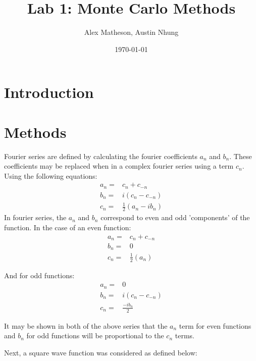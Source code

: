 \documentclass[twocolumn]{article}
\begin{document}
\title{Lab 1: Monte Carlo Methods}
\author{Alex Matheson, Austin Nhung}
\date{\today}
\maketitle

\section{Introduction}

\section{Methods}
Fourier series are defined by calculating the fourier coefficients $a_n$ and $b_n$. These coefficients may be replaced when in a complex fourier series using a term $c_n$. Using the following equations:
\begin{equation}
\begin{split}
a_n =& c_n + c_{-n} \\
b_n =& i(c_n - c_{-n}) \\
c_n =& \frac{1}{2}(a_n - ib_n)
\end{split}
\end{equation}
In fourier series, the $a_n$ and $b_n$ correspond to even and odd 'components' of the function. In the case of an even function:
\begin{equation}
\begin{split}
a_n =& c_n + c_{-n} \\
b_n =& 0 \\
c_n =& \frac{1}{2}(a_n)
\end{split}
\end{equation}

And for odd functions:
\begin{equation}
\begin{split}
a_n =& 0 \\
b_n =& i(c_n - c_{-n}) \\
c_n =& \frac{-ib_n}{2}
\end{split}
\end{equation} 
 
It may be shown in both of the above series that the $a_n$ term for even functions and $b_n$ for odd functions will be proportional to the $c_n$ terms. 

Next, a square wave function was considered as defined below: 
\end{document}

